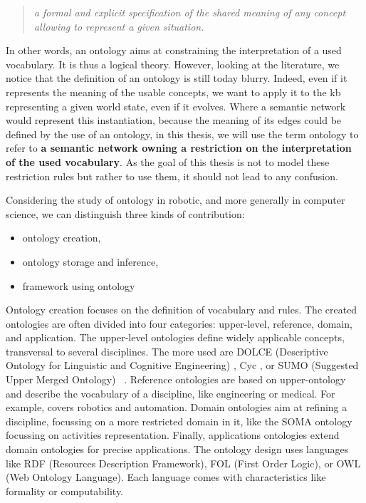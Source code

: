 \begin{quote} 
\centering 
\textit{a formal and explicit specification of the shared meaning of any concept allowing to represent a given situation.}
\end{quote}

In other words, an ontology aims at constraining the interpretation of a used vocabulary. It is thus a logical theory. However, looking at the literature, we notice that the definition of an ontology is still today blurry. Indeed, even if it represents the meaning of the usable concepts, we want to apply it to the \acrshort{kb} representing a given world state, even if it evolves. Where a semantic network would represent this instantiation, because the meaning of its edges could be defined by the use of an ontology, in this thesis, we will use the term ontology to refer to \textbf{a semantic network owning a restriction on the interpretation of the used vocabulary}. As the goal of this thesis is not to model these restriction rules but rather to use them, it should not lead to any confusion.

Considering the study of ontology in robotic, and more generally in computer science, we can distinguish three kinds of contribution:

\begin{itemize}
  \item ontology creation,
  \item ontology storage and inference,
  \item framework using ontology
\end{itemize}

Ontology creation focuses on the definition of vocabulary and rules. The created ontologies are often divided into four categories: upper-level, reference, domain, and application. The upper-level ontologies define widely applicable concepts, transversal to several disciplines. The more used are DOLCE (Descriptive Ontology for Linguistic and Cognitive Engineering) \cite{masolo_2003_dolce}, Cyc \cite{lenat_1989_building}, or SUMO (Suggested Upper Merged Ontology) ~\cite{niles_2001_towards}. Reference ontologies are based on upper-ontology and describe the vocabulary of a discipline, like engineering or medical. For example, \cite{schlenoff_2015_ieee} covers robotics and automation. Domain ontologies aim at refining a discipline, focussing on a more restricted domain in it, like the SOMA ontology~\cite{bessler_2020_foundations} focussing on activities representation. Finally, applications ontologies extend domain ontologies for precise applications. The ontology design uses languages like RDF (Resources Description Framework), FOL (First Order Logic), or OWL (Web Ontology Language). Each language comes with characteristics like formality or computability.

